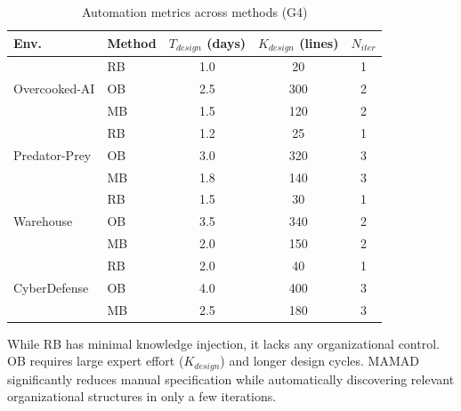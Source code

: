 \documentclass[pdflatex,sn-mathphys-num]{sn-jnl}%
\theoremstyle{thmstyleone}%
\theoremstyle{thmstyletwo}%
\theoremstyle{thmstylethree}%
\begin{document}
\begin{table}[h!]
    \centering
    \caption{Automation metrics across methods (G4)}
    \begin{tabular}{l|l|ccc}
        \hline
        \textbf{Env.} & \textbf{Method} & $T_{design}$ (days) & $K_{design}$ (lines) & $N_{iter}$ \\
        \hline
        \multirow{3}{*}{Overcooked-AI}
                      & RB              & 1.0                 & 20                   & 1          \\
                      & OB              & 2.5                 & 300                  & 2          \\
                      & MB              & 1.5                 & 120                  & 2          \\
        \hline
        \multirow{3}{*}{Predator-Prey}
                      & RB              & 1.2                 & 25                   & 1          \\
                      & OB              & 3.0                 & 320                  & 3          \\
                      & MB              & 1.8                 & 140                  & 3          \\
        \hline
        \multirow{3}{*}{Warehouse}
                      & RB              & 1.5                 & 30                   & 1          \\
                      & OB              & 3.5                 & 340                  & 2          \\
                      & MB              & 2.0                 & 150                  & 2          \\
        \hline
        \multirow{3}{*}{CyberDefense}
                      & RB              & 2.0                 & 40                   & 1          \\
                      & OB              & 4.0                 & 400                  & 3          \\
                      & MB              & 2.5                 & 180                  & 3          \\
        \hline
    \end{tabular}
    \label{tab:g4_full}
\end{table}

While RB has minimal knowledge injection, it lacks any organizational control. OB requires large expert effort ($K_{design}$) and longer design cycles. MAMAD significantly reduces manual specification while automatically discovering relevant organizational structures in only a few iterations.
\end{document}
